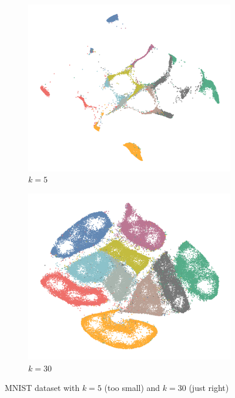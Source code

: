 \begin{figure}[!tbp]
  \begin{subfigure}{.45\linewidth}
    \centering
    \includegraphics[width=\linewidth]{img/mnist_k_5-1}
    \caption{$k = 5$}
    \label{fig:mnist-too-small}
  \end{subfigure}
  \begin{subfigure}{.45\linewidth}
    \centering
    \includegraphics[width=\linewidth]{img/mnist_k_30-1}
    \caption{$k = 30$}
    \label{fig:mnist-ok}
  \end{subfigure}
  \caption{MNIST dataset with $k = 5$ (too small) and $k = 30$ (just right)}
  \label{fig:too-small-k}
\end{figure}

